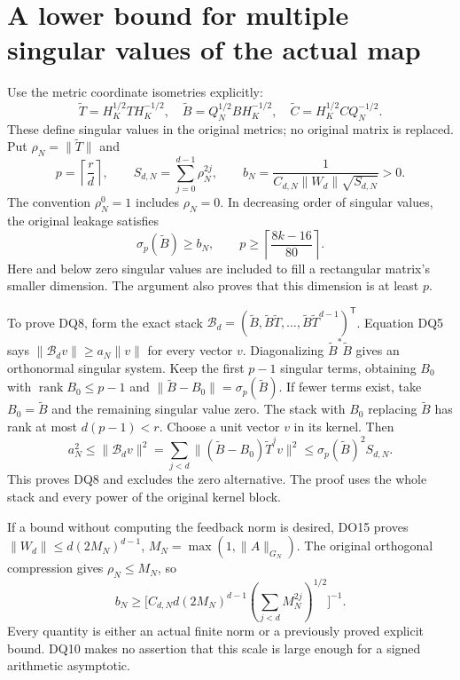 \documentclass[11pt]{article}
\DeclareMathOperator{\rank}{rank}
\begin{document}
\section{A lower bound for multiple singular values of the actual map}
Use the metric coordinate isometries explicitly:
\[
 \widetilde T=H_K^{1/2}TH_K^{-1/2},\quad
 \widetilde B=Q_N^{1/2}BH_K^{-1/2},\quad
 \widetilde C=H_K^{1/2}CQ_N^{-1/2}.
 \tag{DQ6}
\]
These define singular values in the original metrics; no original matrix
is replaced. Put $\rho_N=\|\widetilde T\|$ and
\[
 p=\left\lceil\frac rd\right\rceil,\qquad
 S_{d,N}=\sum_{j=0}^{d-1}\rho_N^{2j},\qquad
 b_N=\frac{1}{C_{d,N}\|W_d\|\sqrt{S_{d,N}}}>0.
 \tag{DQ7}
\]
The convention $\rho_N^0=1$ includes $\rho_N=0$. In decreasing
order of singular values, the original leakage satisfies
\[
 \boxed{\sigma_p(\widetilde B)\ge b_N,
 \qquad p\ge\left\lceil\frac{8k-16}{80}\right\rceil.}
 \tag{DQ8}
\]
Here and below zero singular values are included to fill a rectangular
matrix's smaller dimension. The argument also proves that this dimension
is at least $p$.

To prove DQ8, form the exact stack
$\mathcal B_d=(\widetilde B,\widetilde B\widetilde T,\ldots,
\widetilde B\widetilde T^{d-1})^{\mathsf T}$. Equation DQ5 says
$\|\mathcal B_dv\|\ge a_N\|v\|$ for every vector $v$.
Diagonalizing $\widetilde B^*\widetilde B$ gives an orthonormal
singular system. Keep the first $p-1$ singular terms, obtaining $B_0$
with $\rank B_0\le p-1$ and
$\|\widetilde B-B_0\|=\sigma_p(\widetilde B)$.
If fewer terms exist, take $B_0=\widetilde B$ and the remaining
singular value zero. The stack with $B_0$ replacing $\widetilde B$
has rank at most $d(p-1)<r$. Choose a unit vector $v$ in its kernel.
Then
\[
 a_N^2\le\|\mathcal B_dv\|^2
 =\sum_{j<d}\|(\widetilde B-B_0)\widetilde T^jv\|^2
 \le\sigma_p(\widetilde B)^2 S_{d,N}.
 \tag{DQ9}
\]
This proves DQ8 and excludes the zero alternative. The proof uses the
whole stack and every power of the original kernel block.

If a bound without computing the feedback norm is desired, DO15 proves
$\|W_d\|\le d(2M_N)^{d-1}$, $M_N=\max(1,\|A\|_{G_N})$.
The original orthogonal compression gives $\rho_N\le M_N$, so
\[
 b_N\ge
 \bigl[C_{d,N}d(2M_N)^{d-1}
         (\sum_{j<d}M_N^{2j})^{1/2}\bigr]^{-1}.
 \tag{DQ10}
\]
Every quantity is either an actual finite norm or a previously proved
explicit bound. DQ10 makes no assertion that this scale is large enough
for a signed arithmetic asymptotic.
\end{document}
